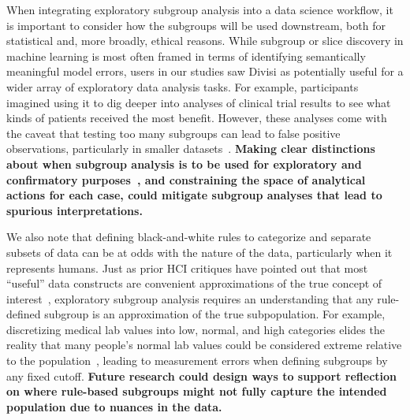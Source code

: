 When integrating exploratory subgroup analysis into a data science workflow, it is important to consider how the subgroups will be used downstream, both for statistical and, more broadly, ethical reasons. 
While subgroup or slice discovery in machine learning is most often framed in terms of identifying semantically meaningful model errors, users in our studies saw Divisi as potentially useful for a wider array of exploratory data analysis tasks.
For example, participants imagined using it to dig deeper into analyses of clinical trial results to see what kinds of patients received the most benefit.
However, these analyses come with the caveat that testing too many subgroups can lead to false positive observations, particularly in smaller datasets~\cite{wang_statistics_2007}.
\textbf{Making clear distinctions about when subgroup analysis is to be used for exploratory and confirmatory purposes~\cite{hullman_designing_2021}, and constraining the space of analytical actions for each case, could mitigate subgroup analyses that lead to spurious interpretations.}

We also note that defining black-and-white rules to categorize and separate subsets of data can be at odds with the nature of the data, particularly when it represents humans.
Just as prior HCI critiques have pointed out that most ``useful'' data constructs are convenient approximations of the true concept of interest~\cite{tal_target_2023}, exploratory subgroup analysis requires an understanding that any rule-defined subgroup is an approximation of the true subpopulation.
For example, discretizing medical lab values into low, normal, and high categories elides the reality that many people's normal lab values could be considered extreme relative to the population~\cite{cohen_personalized_2021}, leading to measurement errors when defining subgroups by any fixed cutoff.
\textbf{Future research could design ways to support reflection on where rule-based subgroups might not fully capture the intended population due to nuances in the data.}

